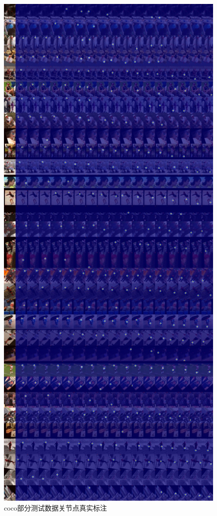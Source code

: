 \begin{figure}[h]
	\centering
	\includegraphics[scale=0.4]{figures/21.jpg}
	\caption{coco部分测试数据关节点真实标注}
	\label{fig:f21}
\end{figure}
